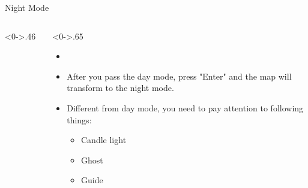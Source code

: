 \documentclass[notheorems]{beamer}
\begin{document}
\begin{framenl}{Night Mode}
	\begin{columns}[T] %
		\begin{column}<0->{.46\textwidth}
			\begin{figure}[thpb]
				\centering
				\end{figure}
			\end{column}%
		\hfill%
		\begin{column}<0->{.65\textwidth}
			\begin{itemize}
			\item []
			\item<1-> After you pass the day mode, press "Enter" and the map will transform to the night mode.
			\item<2-> Different from day mode, you need to pay attention to following things:
				\begin{itemize}
					\item Candle light
					\item Ghost
					\item Guide
				\end{itemize}
			\end{itemize}
		\end{column}%
	\end{columns}
\end{framenl}
\end{document}

